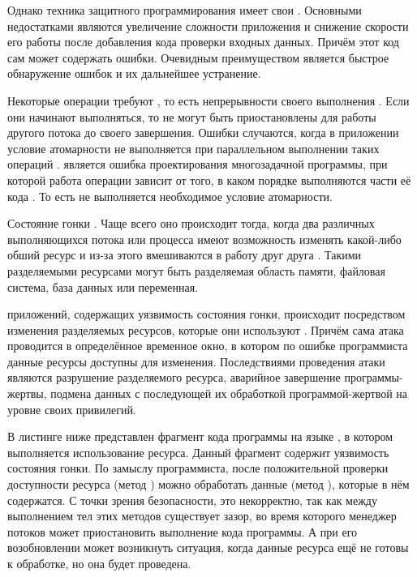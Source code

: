 %
Однако техника защитного программирования имеет свои  . 
%
Основными недостатками являются увеличение сложности приложения и снижение скорости его работы после добавления кода проверки входных данных. 
%
Причём этот код сам может содержать ошибки. 
%
Очевидным преимуществом является быстрое обнаружение ошибок и их дальнейшее устранение.



%
Некоторые операции требуют , то есть непрерывности своего выполнения . 
%
Если они начинают выполняться, то не могут быть приостановлены для работы другого потока до своего завершения. 
%
Ошибки случаются, когда в приложении условие атомарности не выполняется при параллельном выполнении таких операций . 
%
 является ошибка проектирования многозадачной программы, при которой работа операции зависит от того, в каком порядке выполняются части её кода . 
%
То есть не выполняется необходимое условие атомарности.

%
Состояние гонки . 
%
Чаще всего оно происходит тогда, когда два различных выполняющихся потока или процесса имеют возможность изменять какой-либо обший ресурс и из-за этого вмешиваются в работу друг друга  . 
%
Такими разделяемыми ресурсами могут быть разделяемая область памяти, файловая система, база данных или переменная. 

%
 приложений, содержащих уязвимость состояния гонки, происходит посредством изменения разделяемых ресурсов, которые они используют . 
%
Причём сама атака проводится в определённое временное окно, в котором по ошибке программиста данные ресурсы доступны для изменения. 
%
Последствиями проведения атаки являются разрушение разделяемого ресурса, аварийное завершение программы-жертвы, подмена данных с последующей их обработкой программой-жертвой на уровне своих привилегий. 

%
В листинге ниже представлен фрагмент кода программы на языке , в котором выполняется использование ресурса. 
%
Данный фрагмент содержит уязвимость состояния гонки. 
%
По замыслу программиста, после положительной проверки доступности ресурса (метод ) можно обработать данные (метод ), которые в нём содержатся. 
% 
С точки зрения безопасности, это некорректно, так как между выполнением тел этих методов существует зазор, во время которого менеджер потоков может приостановить выполнение кода программы. 
%
А при его возобновлении может возникнуть ситуация, когда данные ресурса ещё не готовы к обработке, но она будет проведена. 

